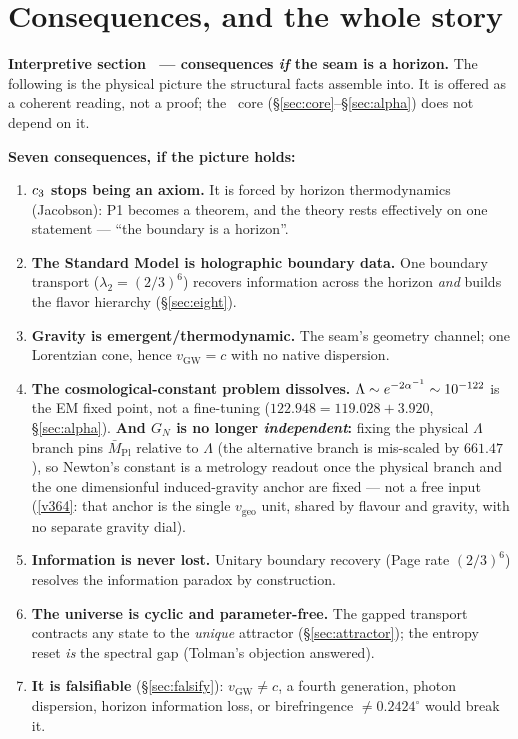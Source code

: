 \section{Consequences, and the whole story \mC}\label{sec:consequences}
\par\smallskip\noindent\textbf{Interpretive section \mC\ --- consequences \emph{if} the seam is a horizon.}
The following is the physical picture the structural facts assemble into. It is offered as a coherent
reading, not a proof; the \mE\ core (\S\ref{sec:core}--\S\ref{sec:alpha}) does not depend on it.
\par\smallskip

\noindent\textbf{Seven consequences, if the picture holds:}
\begin{enumerate}[leftmargin=1.7em]
\item \textbf{$c_3$ stops being an axiom.} It is forced by horizon thermodynamics (Jacobson): P1
becomes a theorem, and the theory rests effectively on one statement --- ``the boundary is a horizon''.
\item \textbf{The Standard Model is holographic boundary data.} One boundary transport ($\lambda_2=(2/3)^6$)
recovers information across the horizon \emph{and} builds the flavor hierarchy (\S\ref{sec:eight}).
\item \textbf{Gravity is emergent/thermodynamic.} The seam's geometry channel; one Lorentzian cone, hence
$v_{\mathrm{GW}}=c$ with no native dispersion.
\item \textbf{The cosmological-constant problem dissolves.} $\Lambda\sim e^{-2\alpha^{-1}}\sim10^{-122}$ is the EM
fixed point, not a fine-tuning ($122.948=119.028+3.920$, \S\ref{sec:alpha}). \textbf{And $G_N$ is no longer
\emph{independent}:} fixing the physical $\Lambda$ branch pins $\bar M_{\mathrm{Pl}}$ relative to $\Lambda$
(the alternative branch is mis-scaled by $661.47$), so Newton's constant is a metrology readout once the
physical branch and the one dimensionful induced-gravity anchor are fixed --- not a free input
(\vref{v364}: that anchor is the single $v_{\mathrm{geo}}$ unit, shared by flavour and gravity, with no
separate gravity dial).
\item \textbf{Information is never lost.} Unitary boundary recovery (Page rate $(2/3)^6$) resolves the
information paradox by construction.
\item \textbf{The universe is cyclic and parameter-free.} The gapped transport contracts any state to the
\emph{unique} attractor (\S\ref{sec:attractor}); the entropy reset \emph{is} the spectral gap (Tolman's
objection answered).
\item \textbf{It is falsifiable} (\S\ref{sec:falsify}): $v_{\mathrm{GW}}\neq c$, a fourth generation,
photon dispersion, horizon information loss, or birefringence $\neq0.2424^\circ$ would break it.
\end{enumerate}

